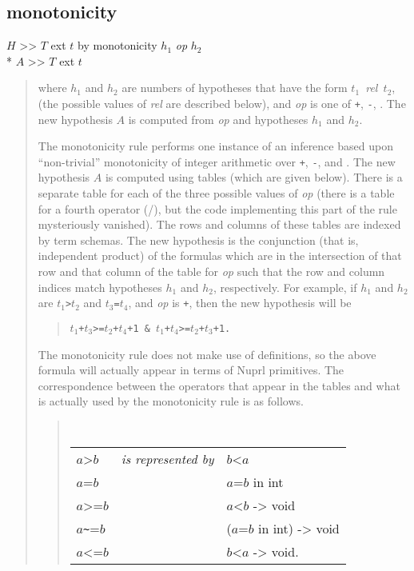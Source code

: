 \subsection*{monotonicity}

\goal $H$ >> $T$ ext $t$ by monotonicity  $h_1$ {\em{}op} $h_2$\\*
\subgoal  $A$ >> $T$ ext $t$
\begin{quote}\rm

where $h_1$ and $h_2$ are numbers of hypotheses that have the form
\mbox{\em$t_1$ rel $t_2$},
(the possible values of {\em rel} are described below), and {\em{}op} is
one of {\tt +}, {\tt -}, {\tt *}.  The new hypothesis $A$ is computed from
{\em{}op} and hypotheses $h_1$ and $h_2$.


The monotonicity rule performs one instance of an inference based upon
``non-trivial'' monotonicity of integer arithmetic over {\tt +}, {\tt -}, and
{\tt *}.  The new hypothesis $A$ is computed using tables (which are given
below).  There is a separate table for each of the three possible values of
{\em{}op} (there is a table for a fourth operator (/), but the code
implementing this part of the rule mysteriously vanished).  The rows and
columns of these tables are indexed by term schemas.  The new hypothesis is
the conjunction (that is, independent product) of the formulas which are in
the intersection of that row and that column of the table for {\em{}op}
such that the row and column indices match hypotheses $h_1$ and $h_2$,
respectively.  For example, if $h_1$ and $h_2$ are {\tt $t_1$>$t_2$} and
{\tt $t_3$=$t_4$}, and {\em{}op} is {\tt +}, then the new hypothesis will
be
\begin{quote}
\tt $t_1$+$t_3$>=$t_2$+$t_4$+1  \&  $t_1$+$t_4$>=$t_2$+$t_3$+1.  
\end{quote}


The monotonicity rule does not make use of definitions, so the above
formula will actually appear in terms of Nuprl primitives.  The
correspondence between the operators that appear in the tables and what is
actually used by the monotonicity rule is as follows.
\begin{quote} \tt
\begin{tabular}{lll} 
        $a$>$b$ &   {\em is represented by} &       $b$<$a$   \\
        $a$=$b$  & &                           $a$=$b$ in int \\
        $a$>=$b$ & &                           $a$<$b$ -> void   \\
        $a$\verb`~`=$b$ & &                         ($a$=$b$ in int) -> void \\
        $a$<=$b$ & &                        $b$<$a$ -> void.
\end{tabular}
\end{quote}


\end{quote}
